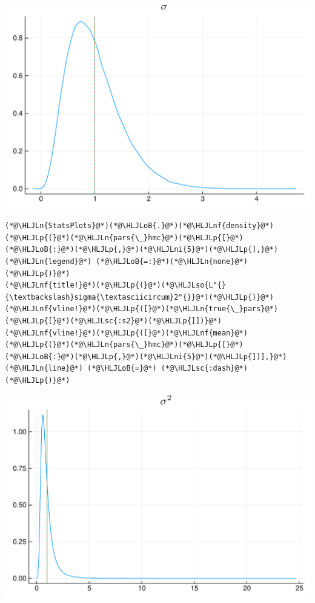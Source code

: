 \documentclass[12pt,a4paper]{article}
\newcommand{\HLJLn}[1]{#1}
\newcommand{\HLJLnf}[1]{\textcolor[RGB]{66,102,213}{#1}}
\newcommand{\HLJLsc}[1]{\textcolor[RGB]{201,61,57}{#1}}
\newcommand{\HLJLso}[1]{\textcolor[RGB]{201,61,57}{#1}}
\newcommand{\HLJLni}[1]{\textcolor[RGB]{59,151,46}{#1}}
\newcommand{\HLJLoB}[1]{\textcolor[RGB]{102,102,102}{\textbf{#1}}}
\newcommand{\HLJLp}[1]{#1}
\begin{document}
\includegraphics[width=\linewidth]{figures/dsge_and_julia_38_1.pdf}

\begin{lstlisting}
(*@\HLJLn{StatsPlots}@*)(*@\HLJLoB{.}@*)(*@\HLJLnf{density}@*)(*@\HLJLp{(}@*)(*@\HLJLn{pars{\_}hmc}@*)(*@\HLJLp{[}@*)(*@\HLJLoB{:}@*)(*@\HLJLp{,}@*)(*@\HLJLni{5}@*)(*@\HLJLp{],}@*) (*@\HLJLn{legend}@*) (*@\HLJLoB{=:}@*)(*@\HLJLn{none}@*)(*@\HLJLp{)}@*)
(*@\HLJLnf{title!}@*)(*@\HLJLp{(}@*)(*@\HLJLso{L"{}{\textbackslash}sigma{\textasciicircum}2"{}}@*)(*@\HLJLp{)}@*)
(*@\HLJLnf{vline!}@*)(*@\HLJLp{([}@*)(*@\HLJLn{true{\_}pars}@*)(*@\HLJLp{[}@*)(*@\HLJLsc{:s2}@*)(*@\HLJLp{]])}@*)
(*@\HLJLnf{vline!}@*)(*@\HLJLp{([}@*)(*@\HLJLnf{mean}@*)(*@\HLJLp{(}@*)(*@\HLJLn{pars{\_}hmc}@*)(*@\HLJLp{[}@*)(*@\HLJLoB{:}@*)(*@\HLJLp{,}@*)(*@\HLJLni{5}@*)(*@\HLJLp{])],}@*) (*@\HLJLn{line}@*) (*@\HLJLoB{=}@*) (*@\HLJLsc{:dash}@*)(*@\HLJLp{)}@*)
\end{lstlisting}

\includegraphics[width=\linewidth]{figures/dsge_and_julia_39_1.pdf}
\end{document}
